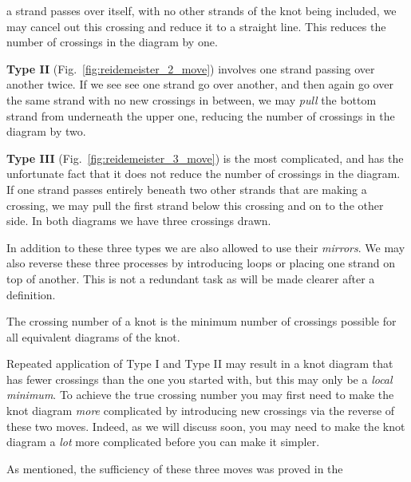         a strand passes over itself, with no other strands of the knot being
        included, we may cancel out this crossing and reduce it to a straight
        line. This reduces the number of crossings in the diagram by one.
        \par\hfill\par
        \textbf{Type II} (Fig.~\ref{fig:reidemeister_2_move}) involves one
        strand passing over another twice. If we see see one strand go over
        another, and then again go over the same strand with no new crossings
        in between, we may \textit{pull} the bottom strand from underneath
        the upper one, reducing the number of crossings in the diagram by two.
        \par\hfill\par
        \textbf{Type III} (Fig.~\ref{fig:reidemeister_3_move}) is the most
        complicated, and has the unfortunate fact that it does not reduce the
        number of crossings in the diagram. If one strand passes entirely
        beneath two other strands that are making a crossing, we may pull the
        first strand below this crossing and on to the other side. In both
        diagrams we have three crossings drawn.
        \par\hfill\par
        In addition to these three types we are also allowed to use their
        \textit{mirrors}. We may also reverse these three processes by
        introducing loops or placing one strand on top of another. This is not
        a redundant task as will be made clearer after a definition.
        \begin{definition}
            The crossing number of a knot is the minimum number of crossings
            possible for all equivalent diagrams of the knot.
        \end{definition}
        Repeated application of Type I and Type II may result in
        a knot diagram that has fewer crossings than the one you started with,
        but this may only be a \textit{local minimum}. To achieve the true
        crossing number you may first need to make the knot diagram
        \textit{more} complicated by introducing new crossings via the reverse
        of these two moves. Indeed, as we will discuss soon, you may need to
        make the knot diagram a \textit{lot} more complicated before you can
        make it simpler.
        \par\hfill\par
        As mentioned, the sufficiency of these three moves was proved in the
